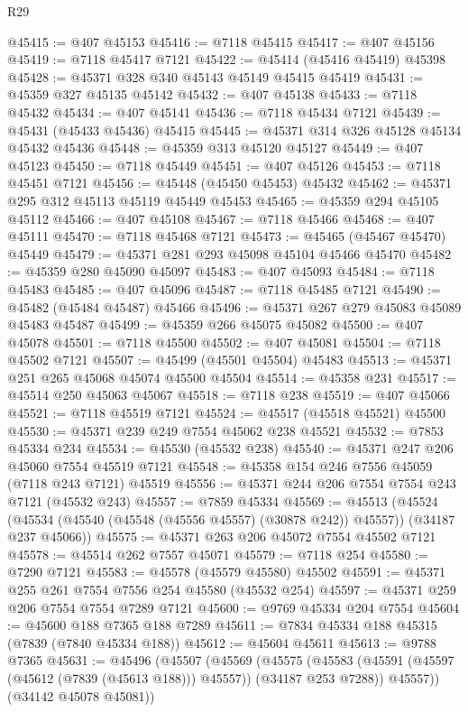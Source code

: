 \begin{lexlean}{R29}
\begin{coremodule}
@45415 := @407 @45153
@45416 := @7118 @45415
@45417 := @407 @45156
@45419 := @7118 @45417 @7121
@45422 := @45414 (@45416 @45419) @45398
@45428 := @45371 @328 @340 @45143 @45149 @45415 @45419
@45431 := @45359 @327 @45135 @45142
@45432 := @407 @45138
@45433 := @7118 @45432
@45434 := @407 @45141
@45436 := @7118 @45434 @7121
@45439 := @45431 (@45433 @45436) @45415
@45445 := @45371 @314 @326 @45128 @45134 @45432 @45436
@45448 := @45359 @313 @45120 @45127
@45449 := @407 @45123
@45450 := @7118 @45449
@45451 := @407 @45126
@45453 := @7118 @45451 @7121
@45456 := @45448 (@45450 @45453) @45432
@45462 := @45371 @295 @312 @45113 @45119 @45449 @45453
@45465 := @45359 @294 @45105 @45112
@45466 := @407 @45108
@45467 := @7118 @45466
@45468 := @407 @45111
@45470 := @7118 @45468 @7121
@45473 := @45465 (@45467 @45470) @45449
@45479 := @45371 @281 @293 @45098 @45104 @45466 @45470
@45482 := @45359 @280 @45090 @45097
@45483 := @407 @45093
@45484 := @7118 @45483
@45485 := @407 @45096
@45487 := @7118 @45485 @7121
@45490 := @45482 (@45484 @45487) @45466
@45496 := @45371 @267 @279 @45083 @45089 @45483 @45487
@45499 := @45359 @266 @45075 @45082
@45500 := @407 @45078
@45501 := @7118 @45500
@45502 := @407 @45081
@45504 := @7118 @45502 @7121
@45507 := @45499 (@45501 @45504) @45483
@45513 := @45371 @251 @265 @45068 @45074 @45500 @45504
@45514 := @45358 @231
@45517 := @45514 @250 @45063 @45067
@45518 := @7118 @238
@45519 := @407 @45066
@45521 := @7118 @45519 @7121
@45524 := @45517 (@45518 @45521) @45500
@45530 := @45371 @239 @249 @7554 @45062 @238 @45521
@45532 := @7853 @45334 @234
@45534 := @45530 (@45532 @238)
@45540 := @45371 @247 @206 @45060 @7554 @45519 @7121
@45548 := @45358 @154 @246 @7556 @45059 (@7118 @243 @7121) @45519
@45556 := @45371 @244 @206 @7554 @7554 @243 @7121 (@45532 @243)
@45557 := @7859 @45334
@45569 := @45513
    (@45524 (@45534 (@45540 (@45548 (@45556 @45557) (@30878 @242)) @45557)) (@34187 @237 @45066))
@45575 := @45371 @263 @206 @45072 @7554 @45502 @7121
@45578 := @45514 @262 @7557 @45071
@45579 := @7118 @254
@45580 := @7290 @7121
@45583 := @45578 (@45579 @45580) @45502
@45591 := @45371 @255 @261 @7554 @7556 @254 @45580 (@45532 @254)
@45597 := @45371 @259 @206 @7554 @7554 @7289 @7121
@45600 := @9769 @45334 @204 @7554
@45604 := @45600 @188 @7365 @188 @7289
@45611 := @7834 @45334 @188 @45315 (@7839 (@7840 @45334 @188))
@45612 := @45604 @45611
@45613 := @9788 @7365
@45631 := @45496
    (@45507
      (@45569
        (@45575
          (@45583 (@45591 (@45597 (@45612 (@7839 (@45613 @188))) @45557)) (@34187 @253 @7288))
          @45557))
      (@34142 @45078 @45081))

\end{coremodule}
\end{lexlean}
